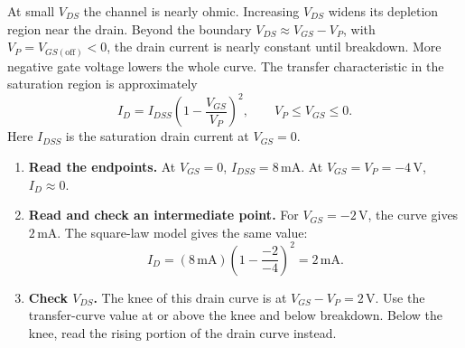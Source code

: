 \documentclass[12pt,a4paper]{article}
\begin{document}
At small \(V_{DS}\) the channel is nearly ohmic. Increasing \(V_{DS}\) widens its depletion region near the drain. Beyond the boundary \(V_{DS}\approx V_{GS}-V_P\), with \(V_P=V_{GS(\mathrm{off})}<0\), the drain current is nearly constant until breakdown. More negative gate voltage lowers the whole curve. The transfer characteristic in the saturation region is approximately
\[
I_D=I_{DSS}\left(1-\frac{V_{GS}}{V_P}\right)^2,\qquad V_P\le V_{GS}\le0 .
\]
Here \(I_{DSS}\) is the saturation drain current at \(V_{GS}=0\).

\begin{tcolorbox}[tikzbox,title={N-channel JFET transfer characteristic in saturation},unbreakable]
\centering
{}
\end{tcolorbox}

\begin{tcolorbox}[examplebox,title={Read the gate-voltage curve and check the bias region}]
\begin{enumerate}[leftmargin=*, itemsep=3pt, topsep=4pt]
  \item \textbf{Read the endpoints.} At \(V_{GS}=0\), \(I_{DSS}=8\,\mathrm{mA}\). At \(V_{GS}=V_P=-4\,\mathrm V\), \(I_D\approx0\).
  \item \textbf{Read and check an intermediate point.} For \(V_{GS}=-2\,\mathrm V\), the curve gives \(2\,\mathrm{mA}\). The square-law model gives the same value:
  \[
    I_D=(8\,\mathrm{mA})\left(1-\frac{-2}{-4}\right)^2=2\,\mathrm{mA}.
  \]
  \item \textbf{Check \(V_{DS}\).} The knee of this drain curve is at \(V_{GS}-V_P=2\,\mathrm V\). Use the transfer-curve value at or above the knee and below breakdown. Below the knee, read the rising portion of the drain curve instead.
\end{enumerate}
\end{tcolorbox}
\end{document}
